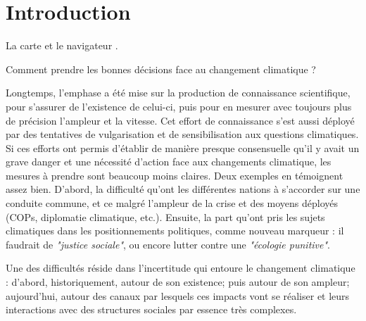 





\chapter*{Introduction}
\newrefsegment




La carte et le navigateur \cite{edenhofer_mapmakers_2014}. 



Comment prendre les bonnes décisions face au changement climatique ? 



Longtemps, l'emphase a été mise sur la production de connaissance scientifique, pour s'assurer de l'existence de celui-ci, puis pour en mesurer avec toujours plus de précision l'ampleur et la vitesse. Cet effort de connaissance s'est aussi déployé par des tentatives de vulgarisation et de sensibilisation aux questions climatiques. Si ces efforts ont permis d'établir de manière presque consensuelle qu'il y avait un grave danger et une nécessité d'action face aux changements climatique, les mesures à prendre sont beaucoup moins claires. Deux exemples en témoignent assez bien. D'abord, la difficulté qu'ont les différentes nations à s'accorder sur une conduite commune, et ce malgré l'ampleur de la crise et des moyens déployés (COPs, diplomatie climatique, etc.). Ensuite, la part qu'ont pris les sujets climatiques dans les positionnements politiques, comme nouveau marqueur : il faudrait de \textit{"justice sociale"}, ou encore lutter contre une \textit{"écologie punitive"}. 

Une des difficultés réside dans l'incertitude qui entoure le changement climatique : d'abord, historiquement, autour de son existence; puis autour de son ampleur; aujourd'hui, autour des canaux par lesquels ces impacts vont se réaliser et leurs interactions avec des structures sociales par essence très complexes. 


